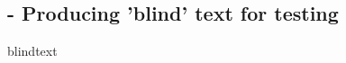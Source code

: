 
\subsection{ - Producing 'blind' text for testing}

\begin{demo}{}{blindtext}
  \blindmathtrue
  \blindtoctrue
  \Blinddocument
\end{demo}

